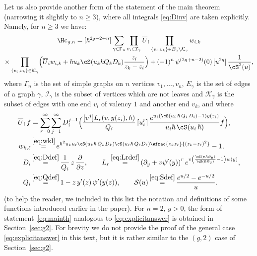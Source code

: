 \begin{remark}\label{rem:generalExplicit}
Let us also provide
another
form of the statement of the main theorem (narrowing it slightly to $n\geq 3$),
where all integrals \eqref{eq:Dinv} are taken explicitly.
Namely, for $n\geq 3$ we have:
\begin{multline}
\label{eq:explicitanswer}
\Hc_{g,n}=
[\hbar^{2g-2+n}] \sum\limits_{\gamma\in\Gamma_n} \prod\limits_{v_i\in\mathcal{I}_\gamma} \overline{U}_i \prod\limits_{\{v_i,v_k\}\in E_\gamma\setminus\mathcal K_\gamma}w_{i,k}
\\
\times\prod_{\{v_i,v_k\}\in\mathcal{K}_\gamma}\Bigl(\overline{U}_i w_{i,k} + \hbar u_k \cS(u_k\hbar Q_kD_k)\frac{z_i}{z_k-z_i} \Bigr)
+ (-1)^{n}\,\psi^{(2g+n-2)}(0)\,[u^{2g}]\,\frac1{\cS^2(u)},
\end{multline}
where $\Gamma_n$ is the set of simple graphs on $n$ vertices $v_1,\ldots,v_n$, $E_\gamma$ is the set of edges of a graph $\gamma$, $\mathcal{I}_\gamma$ is the subset of vertices which are not leaves and $\mathcal{K}_\gamma$ is the subset of edges with one end $v_i$ of valency $1$ and another end $v_k$, and where
\begin{align*}
\overline U_i\, f &= \sum_{r=0}^\infty\sum_{j=1}^\infty D_i^{j-1} \Bigl(\frac{[v^j]L_r(v,y(z_i),\hbar)}{Q_i}
\,[u_i^r]\, \frac{e^{u_i(\cS(u_i\,\hbar\,Q_i\,D_i)-1)y(z_i)}}{u_i\hbar\,\cS(u_i\,\hbar)}f \Bigr),\\
w_{k,\ell}&\mathop{=}^{\eqref{eq:wkl}}e^{\hbar^2u_ku_\ell\cS(u_k\hbar\,Q_k D_k)\cS(u_\ell\hbar\,Q_\ell D_\ell)
\sfrac{z_k z_\ell}{(z_k-z_\ell)^2}}-1, \\
D_i &\mathop{=}^{\eqref{eq:Ddef}} \dfrac{1}{Q_i}\,z\, \dfrac{\partial}{\partial z},\qquad
L_r \mathop{=}^{\eqref{eq:Lrdef}} \left(\partial_y+v\psi'(y)\right)^r e^{v\left(\frac{\cS(v\hbar\partial_y)}{\cS(\hbar\partial_y)}-1\right)\psi(y)},\\
Q_i&\mathop{=}^{\eqref{eq:Qdef}} 1-z\,y'(z)\,\psi'(y(z)),\qquad
\mathcal{S}(u)\mathop{=}^{\eqref{eq:Sdef}}\dfrac{e^{u/2}-e^{-u/2}}{u}.
\end{align*}
(to help the reader, we included in this list the notation and definitions of some functions introduced earlier in the paper). For $n=2$, $g>0$, the form of statement~\eqref{eq:mainth} analogous to \eqref{eq:explicitanswer} is obtained in Section~\ref{sec:g2}. For brevity we do not provide the proof of the general case \eqref{eq:explicitanswer} in this text, but it is rather similar to the $(g,2)$ case of Section~\ref{sec:g2}.
\end{remark}

